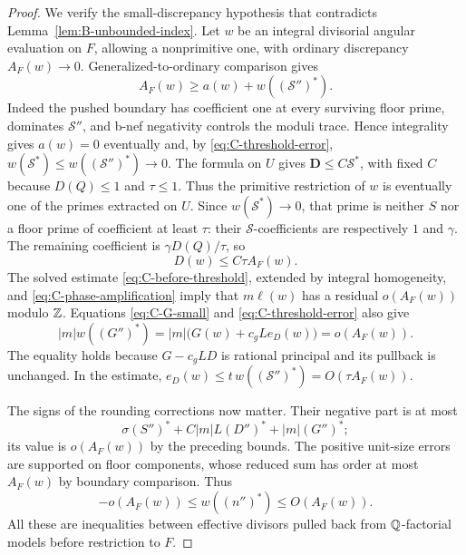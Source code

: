 \begin{proof}
We verify the small-discrepancy hypothesis that contradicts
Lemma~\ref{lem:B-unbounded-index}.  Let $w$ be an integral divisorial
angular evaluation on $F$, allowing a nonprimitive one, with ordinary
discrepancy $A_F(w)\to0$.  Generalized-to-ordinary comparison gives
\begin{equation}\label{eq:C-small-angular}
                  A_F(w)\geq a(w)+w((\mathcal S'')^*).
\end{equation}
Indeed the pushed boundary has coefficient one at every surviving
floor prime, dominates $\mathcal S''$, and b-nef negativity controls
the moduli trace.  Hence integrality gives $a(w)=0$ eventually and,
by \eqref{eq:C-threshold-error},
$w(\mathcal S^*)\leq w((\mathcal S'')^*)\to0$.
The formula on $U$ gives $\mathbf D\leq C\mathcal S^*$, with fixed
$C$ because $D(Q)\leq1$ and $\tau\leq1$.  Thus the primitive
restriction of $w$ is eventually one of the primes extracted on $U$.
Since $w(\mathcal S^*)\to0$, that prime is neither $S$ nor a floor
prime of coefficient at least $\tau$: their $\mathcal S$-coefficients
are respectively $1$ and $\gamma$.  The remaining coefficient is
$\gamma D(Q)/\tau$, so
\begin{equation}\label{eq:C-small-D-threshold}
                   D(w)\leq C\tau A_F(w).
\end{equation}
The solved estimate \eqref{eq:C-before-threshold}, extended by integral
homogeneity, and \eqref{eq:C-phase-amplification} imply that
$m\ell(w)$ has a residual $o(A_F(w))$ modulo $\mathbb Z$.  Equations
\eqref{eq:C-G-small} and \eqref{eq:C-threshold-error} also give
\begin{equation}\label{eq:C-G-threshold-error}
 |m|w((G'')^*)
       =|m|\bigl(G(w)+c_gLe_D(w)\bigr)=o(A_F(w)).
\end{equation}
The equality holds because $G-c_gLD$ is rational principal and its
pullback is unchanged.  In the estimate, $e_D(w)\leq
 t\,w((\mathcal S'')^*)=O(\tau A_F(w))$.

The signs of the rounding corrections now matter.  Their negative
part is at most
\[
 \sigma(S'')^*+C|m|L(D'')^*+|m|(G'')^*;
\]
its value is $o(A_F(w))$ by the preceding bounds.  The positive
unit-size errors are supported on floor components, whose reduced
sum has order at most $A_F(w)$ by boundary comparison.  Thus
\begin{equation}\label{eq:C-signed-rounding}
                   -o(A_F(w))\leq w((n'')^*)\leq O(A_F(w)).
\end{equation}
All these are inequalities between effective divisors pulled back from
$\mathbb Q$-factorial models before restriction to $F$.


\end{proof}
